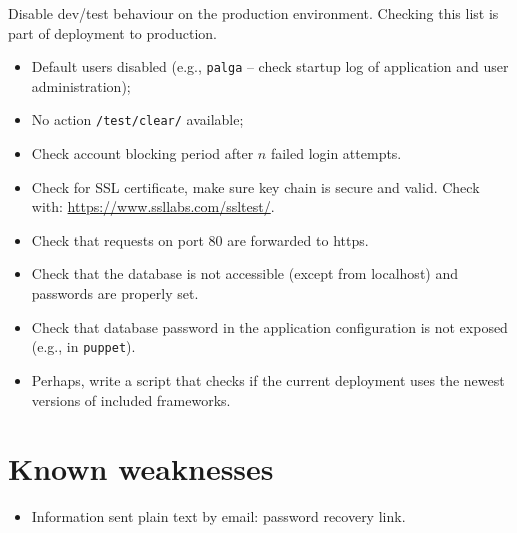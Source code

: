 \documentclass[a4paper]{report}
\begin{document}
Disable dev/test behaviour on the production environment. 
Checking this list is part of deployment to production.
\begin{itemize}
\item Default users disabled (e.g., \texttt{palga} -- check startup log of application and user administration);
\item No action \texttt{/test/clear/} available;
\item Check account blocking period after $n$ failed login attempts.
\item Check for SSL certificate, make sure key chain is secure and valid. Check with: \url{https://www.ssllabs.com/ssltest/}.
\item Check that requests on port 80 are forwarded to https.
\item Check that the database is not accessible (except from localhost) and passwords are properly set.
\item Check that database password in the application configuration is not exposed (e.g., in \texttt{puppet}).
\item Perhaps, write a script that checks if the current deployment uses the newest versions of included frameworks.
\end{itemize}


\section{Known weaknesses}\label{section:knownproblems}

\begin{itemize}
\item Information sent plain text by email: password recovery link.
\end{itemize}



%

\end{document}
